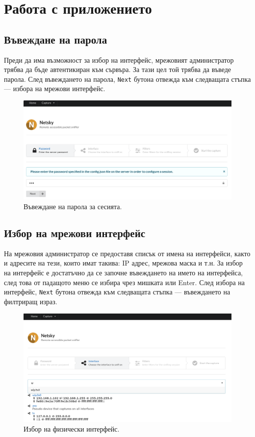 \documentclass[12pt,a4paper,oneside]{book}
\begin{document}
\section{Работа с приложението}

\subsection{Въвеждане на парола}

Преди да има възможност за избор на интерфейс, мрежовият администратор
трябва да бъде автентикиран към сървъра. За тази цел той трябва да въведе парола.
След въвеждането на парола, \texttt{Next} бутона отвежда към следващата стъпка ---
избора на мрежови интерфейс.

\begin{figure}[h!]
  \centering
  \includegraphics[width=\textwidth]{figures/screenshots/password.png}
  \caption{Въвеждане на парола за сесията.}
  \label{screenshots_password_fig}
\end{figure}

\subsection{Избор на мрежови интерфейс}

На мрежовия администратор се предоставя списък от имена на интерфейси, както и
адресите на тези, които имат такива: IP адрес, мрежова маска и т.н. За избор на
интерфейс е достатъчно да се започне въвеждането на името на интерфейса, след
това от падащото меню се избира чрез мишката или Enter. След избора на интерфейс,
\texttt{Next} бутона отвежда към следващата стъпка ---
въвеждането на филтриращ израз.

\begin{figure}[h!]
  \centering
  \includegraphics[width=\textwidth]{figures/screenshots/interface.png}
  \caption{Избор на физически интерфейс.}
  \label{screenshots_interface_fig}
\end{figure}
\end{document}
